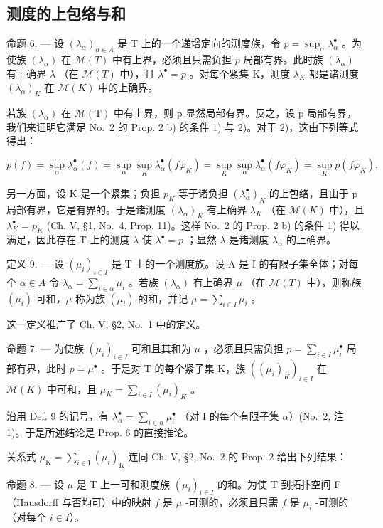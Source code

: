 \subsection{测度的上包络与和}

命题 6. --- 设 \((\lambda_{\alpha})_{\alpha \in A}\) 是 T 上的一个递增定向的测度族，令 \(p = \sup_{\alpha} \lambda_{\alpha}^{\bullet}\) 。为使族 \((\lambda_{\alpha})\) 在 \(\mathcal{M}(T)\) 中有上界，必须且只需负担 \(p\) 局部有界。此时族 \((\lambda_{\alpha})\) 有上确界 \(\lambda\) （在 \(\mathcal{M}(T)\) 中），且 \(\lambda^{\bullet} = p\) 。对每个紧集 K，测度 \(\lambda_{K}\) 都是诸测度 \((\lambda_{\alpha})_{K}\) 在 \(\mathcal{M}(K)\) 中的上确界。

若族 \((\lambda_{\alpha})\) 在 \(\mathcal{M}(\mathrm{T})\) 中有上界，则 p 显然局部有界。反之，设 p 局部有界，我们来证明它满足 No.~2 的 Prop. 2 b) 的条件 1) 与 2)。对于 2)，这由下列等式得出：

\[
p (f) = \sup _ {\alpha} \lambda_ {\alpha} ^ {\bullet} (f) = \sup _ {\alpha} \sup _ {K} \lambda_ {\alpha} ^ {\bullet} (f \varphi_ {K}) = \sup _ {K} \sup _ {\alpha} \lambda_ {\alpha} ^ {\bullet} (f \varphi_ {K}) = \sup _ {K} p (f \varphi_ {K}).
\]

另一方面，设 K 是一个紧集；负担 \(p_{K}\) 等于诸负担 \((\lambda_{\alpha}^{\bullet})_{K}\) 的上包络，且由于 p 局部有界，它是有界的。于是诸测度 \((\lambda_{\alpha})_{K}\) 有上确界 \(\lambda_{K}\) （在 \(\mathcal{M}(K)\) 中），且 \(\lambda_{K}^{\bullet}=p_{K}\) (Ch. V, §1, No.~4, Prop. 11)。这样 No.~2 的 Prop. 2 b) 的条件 1) 得以满足，因此存在 T 上的测度 \(\lambda\) 使 \(\lambda^{\bullet}=p\) ；显然 \(\lambda\) 是诸测度 \(\lambda_{\alpha}\) 的上确界。

定义 9. --- 设 \((\mu_i)_{i \in I}\) 是 T 上的一个测度族。设 A 是 I 的有限子集全体；对每个 \(\alpha \in A\) 令 \(\lambda_\alpha = \sum_{i \in \alpha} \mu_i\) 。若族 \((\lambda_\alpha)\) 有上确界 \(\mu\) （在 \(\mathcal{M}(T)\) 中），则称族 \((\mu_i)\) 可和，\(\mu\) 称为族 \((\mu_i)\) 的和，并记 \(\mu = \sum_{i \in I} \mu_i\) 。

这一定义推广了 Ch. V, §2, No.~1 中的定义。

命题 7. --- 为使族 \((\mu_i)_{i \in I}\) 可和且其和为 \(\mu\) ，必须且只需负担 \(p = \sum_{i \in I} \mu_i^\bullet\) 局部有界，此时 \(p = \mu^\bullet\) 。于是对 T 的每个紧子集 K，族 \(\left((\mu_i)_K\right)_{i \in I}\) 在 \(\mathcal{M}(K)\) 中可和，且 \(\mu_K = \sum_{i \in I} (\mu_i)_K\) 。

沿用 Def. 9 的记号，有 \(\lambda_{\alpha}^{\bullet} = \sum_{i\in \alpha}\mu_{i}^{\bullet}\) （对 I 的每个有限子集 \(\alpha\)）(No.~2, 注 1)。于是所述结论是 Prop. 6 的直接推论。

关系式 \(\mu_{\mathrm{K}} = \sum_{i\in \mathrm{I}}(\mu_i)_{\mathrm{K}}\) 连同 Ch. V, §2, No.~2 的 Prop. 2 给出下列结果：

命题 8. --- 设 \(\mu\) 是 T 上一可和测度族 \((\mu_i)_{i \in I}\) 的和。为使 T 到拓扑空间 F（Hausdorff 与否均可）中的映射 \(f\) 是 \(\mu\) -可测的，必须且只需 \(f\) 是 \(\mu_i\) -可测的（对每个 \(i \in I\)）。

